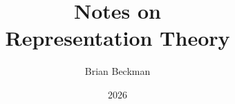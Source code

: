 \documentclass[no-fonts,nols]{tufte-book}
\title[Notes on Representation Theory]{Notes on \\ Representation Theory}
\author{Brian Beckman}
\date{2026}
\theoremstyle{definition}
\theoremstyle{plain}
\theoremstyle{remark}
\begin{document}
\maketitle








\nocite{*}

\end{document}
